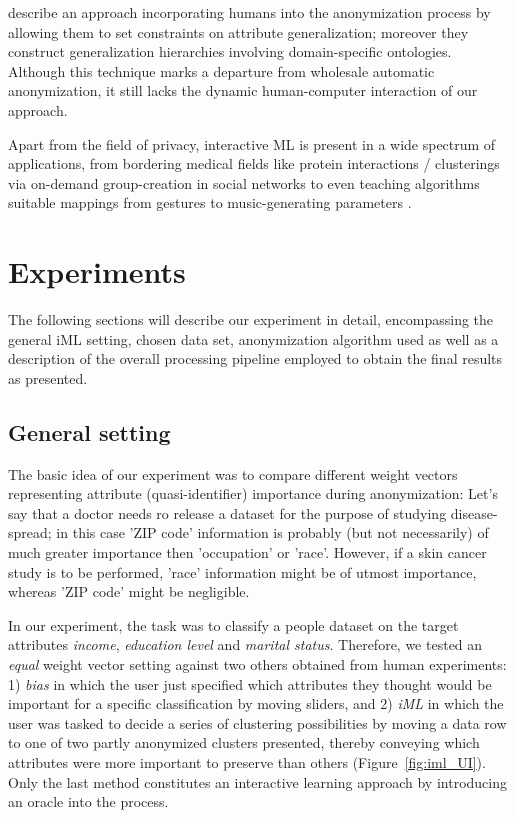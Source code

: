 \documentclass{llncs}
\begin{document}
\cite{Loh2010} describe an approach incorporating humans into the anonymization process by allowing them to set constraints on attribute generalization; moreover they construct generalization hierarchies involving domain-specific ontologies. Although this technique marks a departure from wholesale automatic anonymization, it still lacks the dynamic human-computer interaction of our approach.

Apart from the field of privacy, interactive ML is present in a wide spectrum of applications, from bordering medical fields like protein interactions / clusterings \cite{Amershi2014} via on-demand group-creation in social networks \cite{Amershi2012} to even teaching algorithms suitable mappings from gestures to music-generating parameters \cite{Fiebrink2009}.



\section{Experiments}
\label{sect:experiments}

The following sections will describe our experiment in detail, encompassing the general iML setting, chosen  data set, anonymization algorithm used as well as a description of the overall processing pipeline employed to obtain the final results as presented.


\subsection{General setting}
\label{sect:setting}

The basic idea of our experiment was to compare different weight vectors representing attribute (quasi-identifier) importance during anonymization: Let's say that a doctor needs ro release a dataset for the purpose of studying disease-spread; in this case 'ZIP code' information is probably (but not necessarily) of much greater importance then 'occupation' or 'race'. However, if a skin cancer study is to be performed, 'race' information might be of utmost importance, whereas 'ZIP code' might be negligible.

In our experiment, the task was to classify a people dataset on the target attributes \textit{income}, \textit{education level} and \textit{marital status}. Therefore, we tested an \textit{equal} weight vector setting against two others obtained from human experiments: 1) \textit{bias} in which the user just specified which attributes they thought would be important for a specific classification by moving sliders, and 2) \textit{iML} in which the user was tasked to decide a series of clustering possibilities by moving a data row to one of two partly anonymized clusters presented, thereby conveying which attributes were more important to preserve than others (Figure~\ref{fig:iml_UI}). Only the last method constitutes an interactive learning approach by introducing an oracle into the process.
\end{document}
